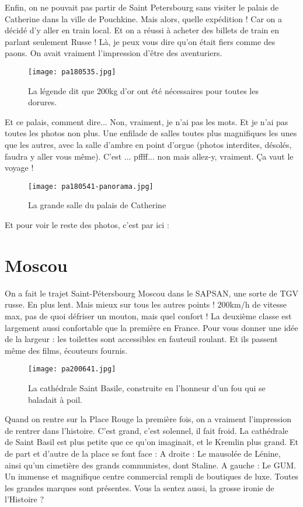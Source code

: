 \documentclass{book}
\begin{document}
Enfin, on ne pouvait pas partir de Saint Petersbourg sans visiter le palais de Catherine dans la ville de Pouchkine. Mais alors, quelle expédition ! Car on a décidé d'y aller en train local. Et on a réussi à acheter des billets de train en parlant seulement Russe ! Là, je peux vous dire qu'on était fiers comme des paons. On avait vraiment l'impression d'être des aventuriers.


\begin{figure}[h]
\centering
\texttt{[image: pa180535.jpg]}
\caption*{ La légende dit que 200kg d'or ont été nécessaires pour toutes les dorures.}
\end{figure}

Et ce palais, comment dire... Non, vraiment, je n'ai pas les mots. Et je n'ai pas toutes les photos non plus. Une enfilade de salles toutes plus magnifiques les unes que les autres, avec la salle d'ambre en point d'orgue (photos interdites, désolés, faudra y aller vous même).
C'est ... pffff... non mais allez-y, vraiment. Ça vaut le voyage !


\begin{figure}[h]
\centering
\texttt{[image: pa180541-panorama.jpg]}
\caption*{La grande salle du palais de Catherine}
\end{figure}

Et pour voir le reste des photos, c'est par ici :



\chapter{Moscou}
On a fait le trajet Saint-Pétersbourg Moscou dans le SAPSAN, une sorte de TGV russe. En plus lent. Mais mieux sur tous les autres points ! 200km/h de vitesse max, pas de quoi défriser un mouton, mais quel confort ! La deuxième classe est largement aussi confortable que la première en France. Pour vous donner une idée de la largeur : les toilettes sont accessibles en fauteuil roulant. Et ils passent même des films, écouteurs fournis.


\begin{figure}[h]
\centering
\texttt{[image: pa200641.jpg]}
\caption*{ La cathédrale Saint Basile, construite en l'honneur d'un fou qui se baladait à poil.}
\end{figure}

Quand on rentre sur la Place Rouge la première fois, on a vraiment l'impression de rentrer dans l'histoire. C'est grand, c'est solennel, il fait froid. La cathédrale de Saint Basil est plus petite que ce qu'on imaginait, et le Kremlin plus grand.
Et de part et d'autre de la place se font face :
A droite : Le mausolée de Lénine, ainsi qu'un cimetière des grands communistes, dont Staline.
A gauche : Le GUM. Un immense et magnifique centre commercial rempli de boutiques de luxe. Toutes les grandes marques sont présentes.
Vous la sentez aussi, la grosse ironie de l'Histoire ?
\end{document}
